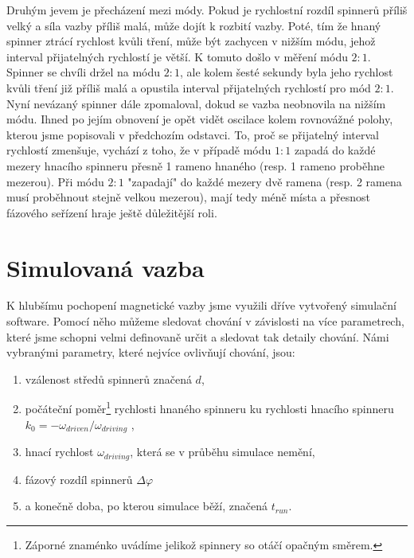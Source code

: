 Druhým jevem je přecházení mezi módy. Pokud je rychlostní rozdíl spinnerů příliš velký a síla vazby příliš malá, může dojít k rozbití vazby. Poté, tím že hnaný spinner ztrácí rychlost kvůli tření, může být zachycen v nižším módu, jehož interval přijatelných rychlostí je větší. K tomuto došlo v měření módu $2:1$. Spinner se chvíli držel na módu $2:1$, ale kolem šesté sekundy byla jeho rychlost kvůli tření již příliš malá a opustila interval přijatelných rychlostí pro mód $2:1$. Nyní nevázaný spinner dále zpomaloval, dokud se vazba neobnovila na nižším módu. Ihned po jejím obnovení je opět vidět oscilace kolem rovnovážné polohy, kterou jsme popisovali v předchozím odstavci. To, proč se přijatelný interval rychlostí zmenšuje, vychází z toho, že v případě módu $1:1$ zapadá do každé mezery hnacího spinneru přesně 1 rameno hnaného (resp. 1 rameno proběhne mezerou). Při módu $2:1$ "zapadají" do každé mezery dvě ramena (resp. 2 ramena musí proběhnout stejně velkou mezerou), mají tedy méně místa a přesnost fázového seřízení hraje ještě důležitější roli.

\clearpage

\section{Simulovaná vazba}

K hlubšímu pochopení magnetické vazby jsme využili dříve vytvořený simulační software. Pomocí něho můžeme sledovat chování v závislosti na více parametrech, které jsme schopni velmi definovaně určit a sledovat tak detaily chování. Námi vybranými parametry, které nejvíce ovlivňují chování, jsou:

\begin{enumerate}[topsep=0pt, partopsep=0pt]
    \setlength{\itemsep}{0pt}%
    \setlength{\parskip}{0pt}%
    \item vzálenost středů spinnerů značená $d$,
    \item počáteční poměr\footnote{Záporné znaménko uvádíme jelikož spinnery so otáčí opačným směrem.} rychlosti hnaného spinneru ku rychlosti hnacího spinneru $k_0 = -\omega_{driven} / \omega_{driving}$ ,
    \item hnací rychlost $\omega_{driving}$, která se v průběhu simulace nemění,
    \item fázový rozdíl spinnerů $\Delta \varphi$
    \item a konečně doba, po kterou simulace běží, značená $t_{run}$. 
\end{enumerate}

